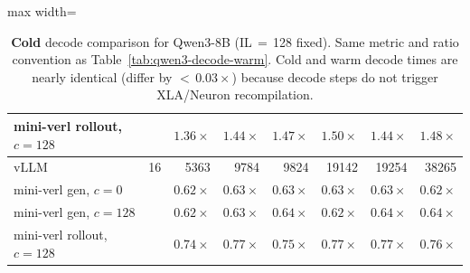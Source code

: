 \begin{table}[htbp]
\begin{adjustbox}{max width=\textwidth}
\begin{tabular}{lcrrrrrr}
        mini-verl rollout, $c{=}128$ &   & $1.36{\times}$ & $1.44{\times}$ & $1.47{\times}$ & $1.50{\times}$ & $1.44{\times}$ & $1.48{\times}$ \\
        \midrule
        vLLM                         & 16 & 5363 & 9784 & 9824 & 19142 & 19254 & 38265 \\
        mini-verl gen, $c{=}0$       &    & $0.62{\times}$ & $0.63{\times}$ & $0.63{\times}$ & $0.63{\times}$ & $0.63{\times}$ & $0.62{\times}$ \\
        mini-verl gen, $c{=}128$     &    & $0.62{\times}$ & $0.63{\times}$ & $0.64{\times}$ & $0.62{\times}$ & $0.64{\times}$ & $0.64{\times}$ \\
        mini-verl rollout, $c{=}128$ &    & $0.74{\times}$ & $0.77{\times}$ & $0.75{\times}$ & $0.77{\times}$ & $0.77{\times}$ & $0.76{\times}$ \\
        \bottomrule
    \end{tabular}
    \end{adjustbox}
    \caption{%
        \textbf{Cold} decode comparison for Qwen3-8B (IL$\,{=}\,$128 fixed).
        Same metric and ratio convention as Table~\ref{tab:qwen3-decode-warm}.
        Cold and warm decode times are nearly identical (differ by
        ${<}\,0.03{\times}$) because decode steps do not trigger
        XLA/Neuron recompilation.
    }
    \label{tab:qwen3-decode-cold}
\end{table}
